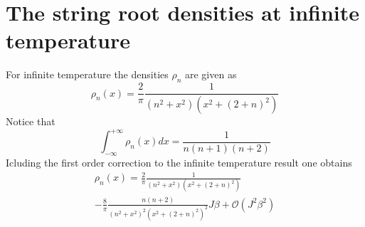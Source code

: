 \documentclass[twocolumn,superscriptaddress,prb,10pt]{revtex4-1}
\begin{document}
\section{The string root densities at infinite temperature}

For infinite temperature the densities $\rho_n$ are given as 
%
\begin{equation}
\rho_n(x)=\frac{2}{\pi}\frac{1}{(n^2+x^2)(x^2+(2+n)^2)}
\end{equation}
%
Notice that 
%
\begin{equation}
\int_{-\infty}^{+\infty}\rho_n(x) dx=\frac{1}{n(n+1)(n+2)}
\end{equation}
%
Icluding the first order correction to the infinite temperature result 
one obtains  
%
\begin{multline}
\label{high-t-rho}
\rho_n(x)=\frac{2}{\pi}\frac{1}{(n^2+x^2)(x^2+(2+n)^2)}\\-
\frac{8}{\pi}\frac{n(n+2)}{(n^2+x^2)^2(x^2+(2+n)^2)^2}J\beta+{\mathcal O}
(J^2\beta^2)
\end{multline}
%
\end{document}
